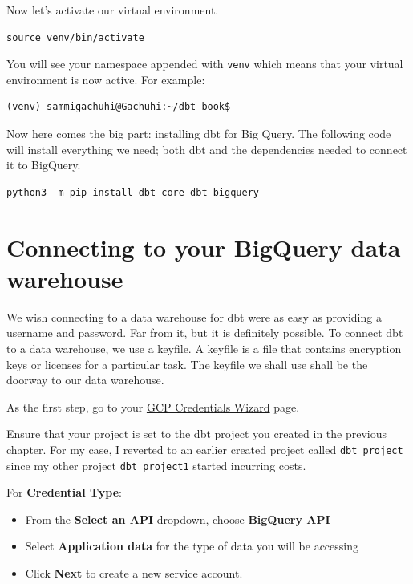 \documentclass[
]{book}
\begin{document}
Now let's activate our virtual environment.

\begin{verbatim}
source venv/bin/activate
\end{verbatim}

You will see your namespace appended with \texttt{venv} which means that your virtual environment is now active. For example:

\begin{verbatim}
(venv) sammigachuhi@Gachuhi:~/dbt_book$ 
\end{verbatim}

Now here comes the big part: installing dbt for Big Query. The following code will install everything we need; both dbt and the dependencies needed to connect it to BigQuery.

\begin{verbatim}
python3 -m pip install dbt-core dbt-bigquery
\end{verbatim}

\hypertarget{connecting-to-your-bigquery-data-warehouse}{%
\section{Connecting to your BigQuery data warehouse}\label{connecting-to-your-bigquery-data-warehouse}}

We wish connecting to a data warehouse for dbt were as easy as providing a username and password. Far from it, but it is definitely possible. To connect dbt to a data warehouse, we use a keyfile. A keyfile is a file that contains encryption keys or licenses for a particular task. The keyfile we shall use shall be the doorway to our data warehouse.

As the first step, go to your \href{https://console.cloud.google.com/apis/credentials/wizard}{GCP Credentials Wizard} page.

Ensure that your project is set to the dbt project you created in the previous chapter. For my case, I reverted to an earlier created project called \texttt{dbt\_project} since my other project \texttt{dbt\_project1} started incurring costs.

For \textbf{Credential Type}:

\begin{itemize}
\item
  From the \textbf{Select an API} dropdown, choose \textbf{BigQuery API}
\item
  Select \textbf{Application data} for the type of data you will be accessing
\item
  Click \textbf{Next} to create a new service account.
\end{itemize}
\end{document}
